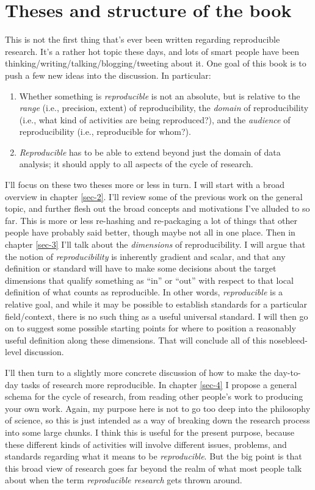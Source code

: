 \documentclass{book}
\begin{document}
\section{Theses and structure of the book}
\label{sec-1-4}

This is not the first thing that's ever been written regarding reproducible research. It's a rather hot topic these days, and lots of smart people have been thinking/writing/talking/blogging/tweeting about it. One goal of this book is to push a few new ideas into the discussion. In particular:

\begin{enumerate}
\item Whether something is \emph{reproducible} is not an absolute, but is relative to the \emph{range} (i.e., precision, extent) of reproducibility, the \emph{domain} of reproducibility (i.e., what kind of activities are being reproduced?), and the \emph{audience} of reproducibility (i.e., reproducible for whom?).
\item \emph{Reproducible} has to be able to extend beyond just the domain of data analysis; it should apply to all aspects of the cycle of research.
\end{enumerate}

I'll focus on these two theses more or less in turn.  I will start with a broad overview in chapter \ref{sec-2}. I'll review some of the previous work on the general topic, and further flesh out the broad concepts and motivations I've alluded to so far. This is more or less re-hashing and re-packaging a lot of things that other people have probably said better, though maybe not all in one place. Then in chapter \ref{sec-3} I'll talk about the \emph{dimensions} of reproducibility. I will argue that the notion of \emph{reproducibility} is inherently gradient and scalar, and that any definition or standard will have to make some decisions about the target dimensions that qualify something as ``in'' or ``out'' with respect to that local definition of what counts as reproducible. In other words, \emph{reproducible} is a relative goal, and while it may be possible to establish standards for a particular field/context, there is no such thing as a useful universal standard. I will then go on to suggest some possible starting points for where to position a reasonably useful definition along these dimensions. That will conclude all of this nosebleed-level discussion.

I'll then turn to a slightly more concrete discussion of how to make the day-to-day tasks of research more reproducible. In chapter \ref{sec-4} I propose a general schema for the cycle of research, from reading other people's work to producing your own work.  Again, my purpose here is not to go too deep into the philosophy of science, so this is just intended as a way of breaking down the research process into some large chunks. I think this is useful for the present purpose, because these different kinds of activities will involve different issues, problems, and standards regarding what it means to be \emph{reproducible}. But the big point is that this broad view of research goes far beyond the realm of what most people talk about when the term \emph{reproducible research} gets thrown around. 
\end{document}
